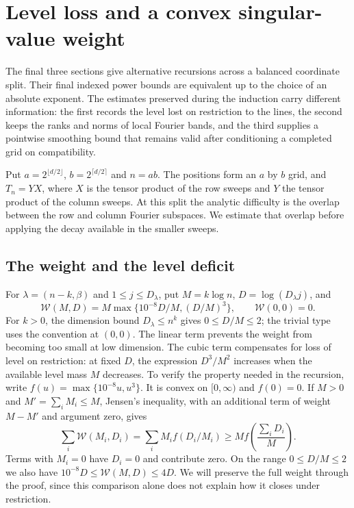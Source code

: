 \section{Level loss and a convex singular-value weight}
\label{rec:sec-grid}
\label{sec:convex-grid}

The final three sections give alternative recursions across a balanced
coordinate split. Their final indexed power bounds are equivalent up
to the choice of an absolute exponent. The estimates preserved during
the induction carry different information: the first records the
level lost on restriction to the lines, the second keeps the ranks and
norms of local Fourier bands, and the third supplies a pointwise
smoothing bound that remains valid after conditioning a completed
grid on compatibility.

Put $a=2^{\lfloor d/2\rfloor}$, $b=2^{\lceil d/2\rceil}$ and
$n=ab$. The positions form an $a$ by $b$ grid, and $T_n=YX$, where
$X$ is the tensor product of the row sweeps and $Y$ the tensor
product of the column sweeps. At this split the analytic difficulty
is the overlap between the row and column Fourier subspaces.
We estimate that overlap before applying the decay available in
the smaller sweeps.

\subsection{The weight and the level deficit}

For $\lambda=(n-k,\beta)$ and $1\le j\le D_\lambda$, put
$M=k\log n$, $D=\log(D_\lambda j)$, and
\begin{equation}\label{rec:perspective-weight}
 \mathcal W(M,D)=M\max\{10^{-8}D/M,(D/M)^3\},\qquad
 \mathcal W(0,0)=0.
\end{equation}
For $k>0$, the dimension bound $D_\lambda\le n^k$ gives
$0\le D/M\le2$; the trivial type uses the convention at $(0,0)$.
The linear term prevents the weight from becoming too small at
low dimension. The cubic term compensates for loss of level on
restriction: at fixed $D$, the expression $D^3/M^2$ increases when
the available level mass $M$ decreases. To verify the property needed in the recursion,
write $f(u)=\max\{10^{-8}u,u^3\}$. It is convex on $[0,\infty)$
and $f(0)=0$. If $M>0$ and $M'=\sum_iM_i\le M$, Jensen's inequality, with
an additional term of weight $M-M'$ and argument zero, gives
\begin{equation}\label{grid:perspective-jensen}
 \sum_i\mathcal W(M_i,D_i)
 =\sum_iM_i f(D_i/M_i)
 \ge M f\left(\frac{\sum_iD_i}{M}\right).
\end{equation}
Terms with $M_i=0$ have $D_i=0$ and contribute zero. On the range
$0\le D/M\le2$ we also have
$10^{-8}D\le\mathcal W(M,D)\le4D$. We will preserve the full
weight through the proof, since this comparison alone does not
explain how it closes under restriction.

